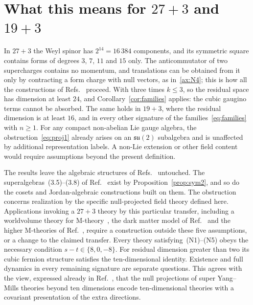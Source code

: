 \section{What this means for \texorpdfstring{$27+3$}{27+3} and \texorpdfstring{$19+3$}{19+3}}
\label{sec:consequences}

In $27+3$ the Weyl spinor has $2^{14}=16\,384$ components, and its symmetric square contains forms of degrees $3$, $7$, $11$ and $15$ only. The anticommutator of two supercharges contains no momentum, and translations can be obtained from it only by contracting a form charge with null vectors, as in~\ref{ax:N4}; this is how all the constructions of Refs.~\cite{NishinoSezgin1996,Sezgin1997,Nishino1998} proceed. With three times $k\le3$, so the residual space has dimension at least $24$, and Corollary~\ref{cor:families} applies: the cubic gaugino terms cannot be absorbed. The same holds in $19+3$, where the residual dimension is at least $16$, and in every other signature of the families~\eqref{eq:families} with $n\ge1$. For any compact non-abelian Lie gauge algebra, the obstruction~\eqref{eq:proj1} already arises on an $\mathfrak{su}(2)$ subalgebra and is unaffected by additional representation labels. A non-Lie extension or other field content would require assumptions beyond the present definition.

The results leave the algebraic structures of Refs.~\cite{RiosMarraniChester2019,TruiniMarraniRios2019,MarraniRiosChester2023} untouched. The superalgebras~(3.5)--(3.8) of Ref.~\cite{RiosMarraniChester2019} exist by Proposition~\ref{prop:sym2}, and so do the cosets and Jordan-algebraic constructions built on them. The obstruction concerns realization by the specific null-projected field theory defined here. Applications invoking a $27+3$ theory by this particular transfer, including a worldvolume theory for M-theory~\cite{RiosMarraniChester2020}, the dark matter model of Ref.~\cite{PaduroiuRiosMarraniChester2021} and the higher M-theories of Ref.~\cite{Banerjee2024}, require a construction outside these five assumptions, or a change to the claimed transfer. Every theory satisfying~(N1)--(N5) obeys the necessary condition $s-t\in\{8,0,-8\}$. For residual dimension greater than two its cubic fermion structure satisfies the ten-dimensional identity. Existence and full dynamics in every remaining signature are separate questions. This agrees with the view, expressed already in Ref.~\cite{RudychevSezginSundell1998}, that the null projections of super Yang--Mills theories beyond ten dimensions encode ten-dimensional theories with a covariant presentation of the extra directions.

